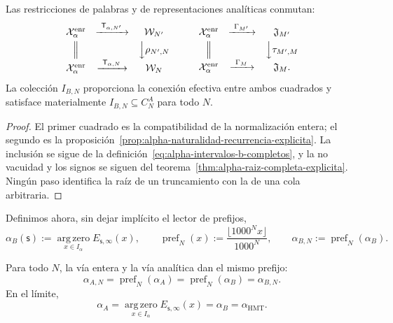 \begin{proposition}
\label{prop:alpha-cuadrados-compatibilidad}
Las restricciones de palabras y de representaciones analíticas conmutan:
\[
\begin{array}{ccc}
 \mathcal X_\alpha^{\mathrm{enr}}&
 \xrightarrow{\ \mathsf T_{\alpha,N'}\ }&\mathcal W_{N'}\\[1mm]
 \Big\Vert&&\Big\downarrow\rho_{N',N}\\[1mm]
 \mathcal X_\alpha^{\mathrm{enr}}&
 \xrightarrow{\ \mathsf T_{\alpha,N}\ }&\mathcal W_N
\end{array}
\qquad
\begin{array}{ccc}
 \mathcal X_\alpha^{\mathrm{enr}}&
 \xrightarrow{\ \Gamma_{M'}\ }&\mathfrak J_{M'}\\[1mm]
 \Big\Vert&&\Big\downarrow\tau_{M',M}\\[1mm]
 \mathcal X_\alpha^{\mathrm{enr}}&
 \xrightarrow{\ \Gamma_M\ }&\mathfrak J_M .
\end{array}
\]
La colección \(I_{B,N}\) proporciona la conexión efectiva entre ambos
cuadrados y satisface materialmente
\(I_{B,N}\subseteq C_N^A\) para todo \(N\).
\end{proposition}

\begin{proof}
El primer cuadrado es la compatibilidad de la normalización entera; el segundo
es la proposición~\ref{prop:alpha-naturalidad-recurrencia-explicita}. La
inclusión se sigue de la definición~\eqref{eq:alpha-intervalos-b-completos},
y la no vacuidad y los signos se siguen del
teorema~\ref{thm:alpha-raiz-completa-explicita}. Ningún paso identifica la
raíz de un truncamiento con la de una cola arbitraria.
\end{proof}

Definimos ahora, sin dejar implícito el lector de prefijos,
\begin{equation}
 \alpha_B(\mathsf s):=
 \operatorname*{arg\,zero}_{x\in I_\alpha}E_{\mathsf s,\infty}(x),
 \qquad
 \operatorname{pref}_N(x):=
 \frac{\lfloor1000^Nx\rfloor}{1000^N},
 \qquad
 \alpha_{B,N}:=\operatorname{pref}_N(\alpha_B).
 \label{eq:alpha-definicion-b-y-prefijos-rev08}
\end{equation}

\begin{theorem}
\label{thm:alpha-dos-publicaciones-completas}
Para todo \(N\), la vía entera y la vía analítica dan el mismo prefijo:
\begin{equation}
 \boxed{\alpha_{A,N}=\operatorname{pref}_N(\alpha_A)
 =\operatorname{pref}_N(\alpha_B)=\alpha_{B,N}.}
 \label{eq:alpha-dos-vias-cada-nivel}
\end{equation}
En el límite,
\begin{equation}
 \boxed{\alpha_A
 =\operatorname*{arg\,zero}_{x\in I_\alpha}
       E_{\mathsf s,\infty}(x)
 =\alpha_B=\alpha_{\mathrm{HMT}}.}
 \label{eq:alpha-dos-vias-limite-coinductivo}
\end{equation}
\end{theorem}

